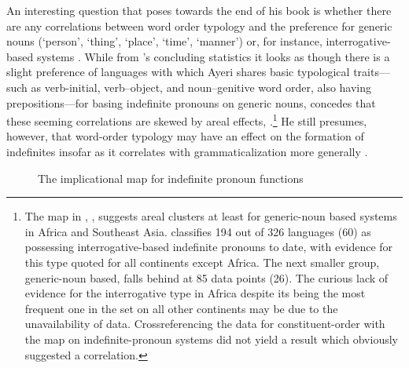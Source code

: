 An interesting question that \citeauthor{haspelmath1997} poses towards the end 
of his book is whether there are any correlations between word order typology 
and the preference for generic nouns (`person', `thing', `place', `time', 
`manner') or, for instance, interrogative-based systems 
\citep[239--241]{haspelmath1997}. While from \citeauthor{haspelmath1997}'s 
concluding statistics it looks as though there is a slight preference of 
languages with which Ayeri shares basic typological traits---such as 
verb-initial, verb–object, and noun–genitive word order, also having 
prepositions---for basing indefinite pronouns on generic nouns, 
\citeauthor{haspelmath1997} concedes that these seeming correlations are skewed 
by areal effects, .\footnote{The map in , 
\citet{wals46A}, suggests areal clusters at least for generic-noun based 
systems in Africa and Southeast Asia.  classifies 194 out of 
326 languages (60\pct) as possessing interrogative-based indefinite pronouns 
to date, with evidence for this type quoted for all continents except Africa. 
The next smaller group, generic-noun based, falls behind at 85 data points 
(26\pct). The curious lack of evidence for the interrogative type in Africa 
despite its being the most frequent one in the set on all other continents may 
be due to the unavailability of data. Crossreferencing the  
data for constituent-order with the map on indefinite-pronoun systems did not 
yield a result which obviously suggested a correlation.} He still presumes, 
however, that word-order typology may have an effect on the formation of 
indefinites insofar as it correlates with grammaticalization more generally 
\citep[239]{haspelmath1997}.

\begin{figure}[tp]\centering
\caption[The implicational map for indefinite pronoun functions]{The 
implicational map for indefinite pronoun functions \citep[4]{haspelmath1997}}


\label{fig:haspeltab}
\end{figure}

